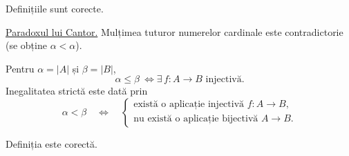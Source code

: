 \noindent Definițiile sunt corecte.

\medskip
\noindent\underline{Paradoxul lui Cantor.}
Mulțimea tuturor numerelor cardinale este contradictorie
(se obține $\alpha<\alpha$).

\medskip
\noindent Pentru $\alpha=|A|$ și $\beta=|B|$,
\[
\alpha\leq\beta\ \iff
\exists\, f:A\longrightarrow B\text{ injectivă}.
\]
Inegalitatea strictă este dată prin
\[
\alpha<\beta\quad\iff\quad
\begin{cases}
\text{există o aplicație injectivă }f:A\longrightarrow B,\\
\text{nu există o aplicație bijectivă }A\longrightarrow B.
\end{cases}
\]

\noindent Definiția este corectă.
\endgroup
